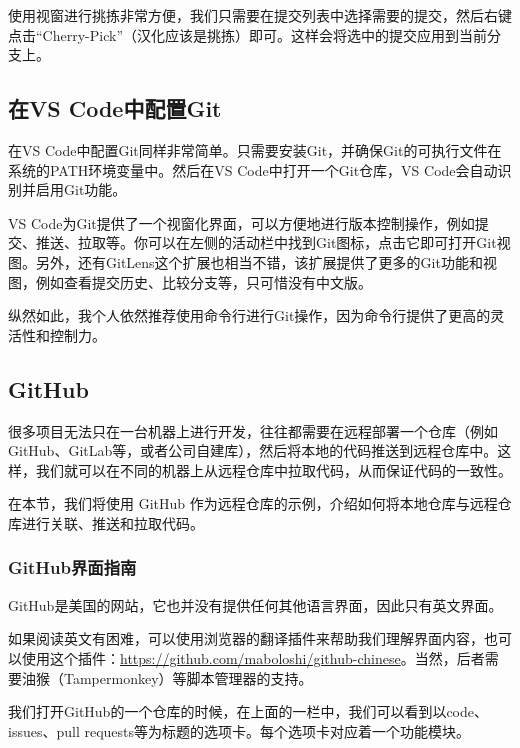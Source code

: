 \documentclass[fontset=none]{ctexart}
\begin{document}
使用视窗进行挑拣非常方便，我们只需要在提交列表中选择需要的提交，然后右键点击“Cherry-Pick”（汉化应该是挑拣）即可。这样会将选中的提交应用到当前分支上。

\subsection{在VS Code中配置Git}

在VS Code中配置Git同样非常简单。只需要安装Git，并确保Git的可执行文件在系统的PATH环境变量中。然后在VS Code中打开一个Git仓库，VS Code会自动识别并启用Git功能。

VS Code为Git提供了一个视窗化界面，可以方便地进行版本控制操作，例如提交、推送、拉取等。你可以在左侧的活动栏中找到Git图标，点击它即可打开Git视图。另外，还有GitLens这个扩展也相当不错，该扩展提供了更多的Git功能和视图，例如查看提交历史、比较分支等，只可惜没有中文版。

纵然如此，我个人依然推荐使用命令行进行Git操作，因为命令行提供了更高的灵活性和控制力。

\subsection{GitHub}
很多项目无法只在一台机器上进行开发，往往都需要在远程部署一个仓库（例如GitHub、GitLab等，或者公司自建库），然后将本地的代码推送到远程仓库中。这样，我们就可以在不同的机器上从远程仓库中拉取代码，从而保证代码的一致性。

在本节，我们将使用 GitHub 作为远程仓库的示例，介绍如何将本地仓库与远程仓库进行关联、推送和拉取代码。

\subsubsection{GitHub界面指南}

\begin{tip}
    GitHub是美国的网站，它也并没有提供任何其他语言界面，因此只有英文界面。

    如果阅读英文有困难，可以使用浏览器的翻译插件来帮助我们理解界面内容，也可以使用这个插件：\faGithub\url{https://github.com/maboloshi/github-chinese}。当然，后者需要油猴（Tampermonkey）等脚本管理器的支持。
\end{tip}

我们打开GitHub的一个仓库的时候，在上面的一栏中，我们可以看到以code、issues、pull requests等为标题的选项卡。每个选项卡对应着一个功能模块。
\end{document}
